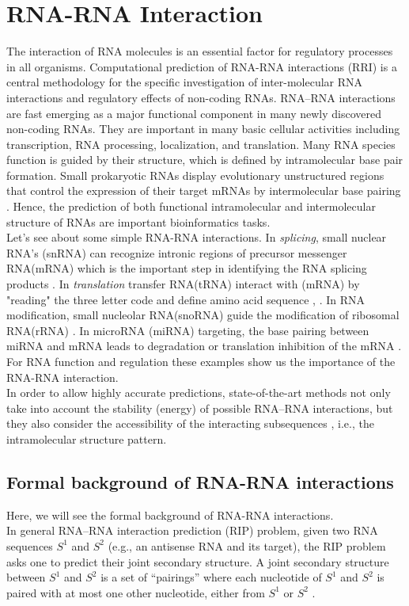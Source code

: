 \documentclass[twoside,a4paper]{report}
\begin{document}
	\section{RNA-RNA Interaction}
 	The interaction of RNA molecules is an essential factor for regulatory processes in all organisms. Computational prediction of RNA-RNA interactions (RRI) is a central methodology for the specific investigation of inter-molecular RNA interactions and regulatory effects of non-coding RNAs. RNA–RNA interactions are fast emerging as a major functional component in many newly discovered non-coding RNAs. They are important in many basic cellular activities including transcription, RNA processing, localization, and translation.  Many RNA species function is guided by their structure, which is defined by intramolecular base pair formation. Small prokaryotic RNAs display evolutionary unstructured regions that control the expression of their target mRNAs by intermolecular base pairing \citep{wright2013comparative}. Hence, the prediction of both functional intramolecular and intermolecular structure of RNAs are important bioinformatics tasks. \\
 	
 	Let's see about some simple RNA-RNA interactions. In \textit{splicing}, small nuclear RNA's (snRNA) can recognize intronic regions of precursor messenger RNA(mRNA) which is the important step in identifying the RNA splicing products \citep{modrek2002genomic}. In \textit{translation} transfer RNA(tRNA) interact with (mRNA) by "reading" the three letter code and define amino acid sequence \citep{selmer2006structure}, \citep{ibba2000aminoacyl}. In RNA modification, small nucleolar RNA(snoRNA) guide the modification of ribosomal RNA(rRNA) \citep{kiss2002small}. In microRNA (miRNA) targeting, the base pairing between  miRNA and mRNA leads to degradation or translation inhibition of the mRNA \citep{bartel2004micrornas}. For RNA function and regulation these examples show us the importance of the RNA-RNA interaction. \\
 		
 	In order to allow highly accurate predictions, state-of-the-art methods not only take into account the stability (energy) of possible RNA–RNA interactions, but they also consider the accessibility of the interacting subsequences \citep{umu2017comprehensive}, i.e., the intramolecular structure pattern.\\
 	
 	\subsection{Formal background of RNA-RNA interactions}
 	Here, we will see the formal background of RNA-RNA interactions.\\
 	In general RNA–RNA interaction prediction (RIP) problem, given two RNA sequences $S^1$ and $S^2$ (e.g., an antisense RNA and its target), the RIP problem asks one to predict their joint secondary structure. A joint secondary structure between $S^1$ and $S^2$ is a set of “pairings” where each nucleotide of $S^1$ and $S^2$ is paired with at most one other nucleotide, either from $S^1$ or $S^2$ \citep{alkan2006rna}.  \\
 	
\end{document}

